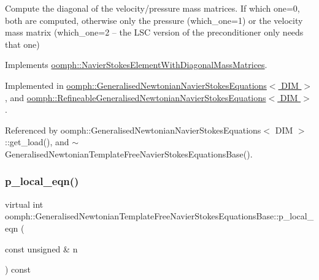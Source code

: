 Compute the diagonal of the velocity/pressure mass matrices. If which one=0, both are computed, otherwise only the pressure (which\+\_\+one=1) or the velocity mass matrix (which\+\_\+one=2 -- the L\+SC version of the preconditioner only needs that one) 



Implements \hyperlink{classoomph_1_1NavierStokesElementWithDiagonalMassMatrices_a4d491d10823eee10381a9b14bce6c244}{oomph\+::\+Navier\+Stokes\+Element\+With\+Diagonal\+Mass\+Matrices}.



Implemented in \hyperlink{classoomph_1_1GeneralisedNewtonianNavierStokesEquations_a6a7432333fec18d7e68efc3f99a02f16}{oomph\+::\+Generalised\+Newtonian\+Navier\+Stokes\+Equations$<$ D\+I\+M $>$}, and \hyperlink{classoomph_1_1RefineableGeneralisedNewtonianNavierStokesEquations_af66689b596908f67bf4af1ad9d6c11eb}{oomph\+::\+Refineable\+Generalised\+Newtonian\+Navier\+Stokes\+Equations$<$ D\+I\+M $>$}.



Referenced by oomph\+::\+Generalised\+Newtonian\+Navier\+Stokes\+Equations$<$ D\+I\+M $>$\+::get\+\_\+load(), and $\sim$\+Generalised\+Newtonian\+Template\+Free\+Navier\+Stokes\+Equations\+Base().

\mbox{\label{classoomph_1_1GeneralisedNewtonianTemplateFreeNavierStokesEquationsBase_abacdc7add36a8da0b68b9f991e7973d9}} 
\subsubsection{\texorpdfstring{p\+\_\+local\+\_\+eqn()}{p\_local\_eqn()}}
{\footnotesize\ttfamily virtual int oomph\+::\+Generalised\+Newtonian\+Template\+Free\+Navier\+Stokes\+Equations\+Base\+::p\+\_\+local\+\_\+eqn (\begin{DoxyParamCaption}\item[{const unsigned \&}]{n }\end{DoxyParamCaption}) const\hspace{0.3cm}{\ttfamily [pure virtual]}}




